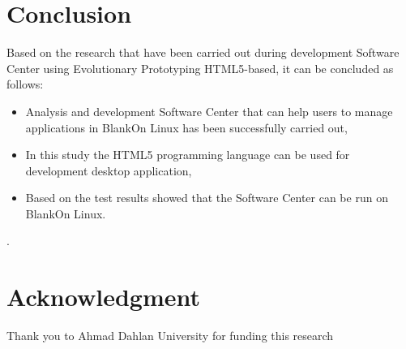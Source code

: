 \documentclass[conference, letterpaper]{IEEEtran}
\begin{document}
\section{Conclusion}
Based on the research that have been carried out during development Software Center using Evolutionary Prototyping HTML5-based, it can be concluded as follows:
\begin{itemize}
\item Analysis and development Software Center that can help users to manage applications in BlankOn Linux has been successfully carried out,
\item In this study the HTML5 programming language can be used for development desktop application,
\item Based on the test results showed that the Software Center can be run on BlankOn Linux.
\end{itemize}.


\section*{Acknowledgment}
Thank you to Ahmad Dahlan University for funding this research


\end{document}

